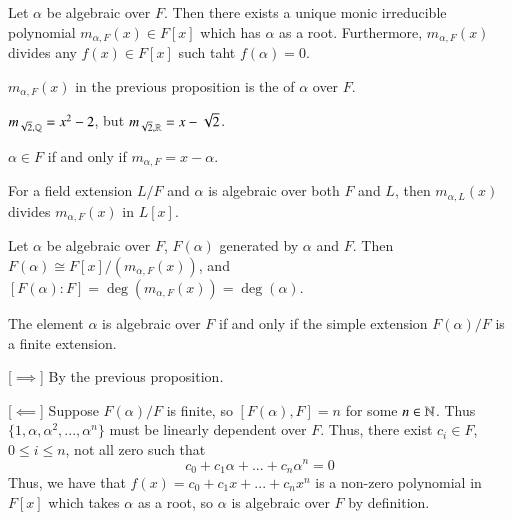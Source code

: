 \documentclass[12pt, a4paper, twoside, openright, titlepage]{book}
\begin{document}
\begin{prop}{}{}
    Let $\alpha$ be algebraic over $F$. Then there exists a unique monic irreducible polynomial $m_{\alpha,F}(x) \in F[x]$ which has $\alpha$ as a root. Furthermore, $m_{\alpha,F}(x)$ divides any $f(x) \in F[x]$ such taht $f(\alpha) = 0$.
\end{prop}


\begin{defn}{}{}
    $m_{\alpha,F}(x)$ in the previous proposition is the  of $\alpha$ over $F$.
\end{defn}


\begin{eg}{}{}
    $m_{\sqrt{2},\mathbb Q} = x^2-2$, but $m_{\sqrt{2},\mathbb R} = x-\sqrt{2}$.
\end{eg}

\begin{cor}{}{}
    $\alpha \in F$ if and only if $m_{\alpha,F} = x-\alpha$.
\end{cor}


\begin{cor}{}{}
    For a field extension $L/F$ and $\alpha$ is algebraic over both $F$ and $L$, then $m_{\alpha,L}(x)$ divides $m_{\alpha,F}(x)$ in $L[x]$.
\end{cor}

\begin{prop}{}{}
    Let $\alpha$ be algebraic over $F$, $F(\alpha)$ generated by $\alpha$ and $F$. Then $F(\alpha) \cong F[x]/(m_{\alpha,F}(x))$, and $[F(\alpha):F] = \deg(m_{\alpha,F}(x)) = \deg(\alpha)$.
\end{prop}


\begin{prop}{}{}
    The element $\alpha$ is algebraic over $F$ if and only if the simple extension $F(\alpha)/F$ is a finite extension.
\end{prop}
\begin{proof*}{}{}
    [$\implies$] By the previous proposition.

    [$\impliedby$] Suppose $F(\alpha)/F$ is finite, so $[F(\alpha),F] = n$ for some $n \in \mathbb N$. Thus $\{1,\alpha,\alpha^2,...,\alpha^n\}$ must be linearly dependent over $F$. Thus, there exist $c_i \in F$, $0 \leq i \leq n$, not all zero such that \begin{equation*}
        c_0 + c_1\alpha + ... + c_n\alpha^n = 0
    \end{equation*}
    Thus, we have that $f(x) = c_0+c_1x+...+c_nx^n$ is a non-zero polynomial in $F[x]$ which takes $\alpha$ as a root, so $\alpha$ is algebraic over $F$ by definition.
\end{proof*}
\end{document}
